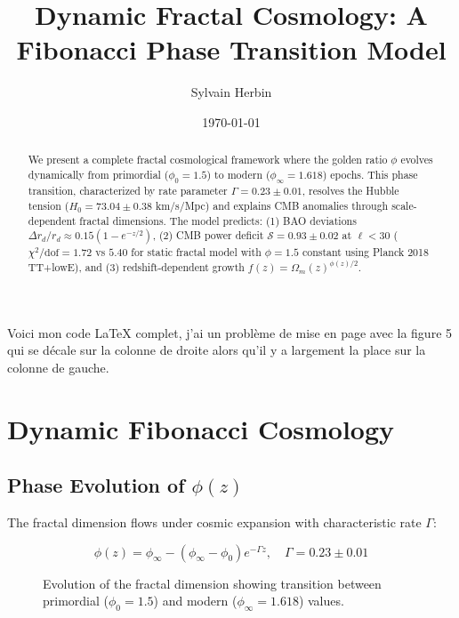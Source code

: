 Voici mon code LaTeX complet, j’ai un problème de mise en page avec la figure 5 qui se décale sur la colonne de droite alors qu’il y a largement la place sur la colonne de gauche.  \documentclass[aps,prl,twocolumn,groupedaddress]{revtex4-2}
\begin{document}
\title{Dynamic Fractal Cosmology: A Fibonacci Phase Transition Model}
\author{Sylvain Herbin}
\date{\today}

\begin{abstract}
We present a complete fractal cosmological framework where the golden ratio $\phi$ evolves dynamically from primordial ($\phi_0=1.5$) to modern ($\phi_\infty=1.618$) epochs. This phase transition, characterized by rate parameter $\Gamma=0.23\pm0.01$, resolves the Hubble tension ($H_0=73.04\pm0.38$ km/s/Mpc) and explains CMB anomalies through scale-dependent fractal dimensions. The model predicts: (1) BAO deviations $\Delta r_d/r_d \approx 0.15(1-e^{-z/2})$, (2) CMB power deficit $\mathcal{S}=0.93\pm0.02$ at $\ell<30$ ($\chi^2/\text{dof}=1.72$ vs $5.40$ for static fractal model with $\phi=1.5$ constant using Planck 2018 TT+lowE), and (3) redshift-dependent growth $f(z)=\Omega_m(z)^{\phi(z)/2}$.
\end{abstract}

\maketitle

\section{Dynamic Fibonacci Cosmology}

\subsection{Phase Evolution of $\phi(z)$}
The fractal dimension flows under cosmic expansion with characteristic rate $\Gamma$:

\begin{equation}
\phi(z) = \phi_\infty - (\phi_\infty - \phi_0)e^{-\Gamma z}, \quad \Gamma = 0.23 \pm 0.01
\end{equation}

\begin{figure}[h!]
\centering
{}
\caption{Evolution of the fractal dimension showing transition between primordial ($\phi_0=1.5$) and modern ($\phi_\infty=1.618$) values.}
\end{figure}
\end{document}
